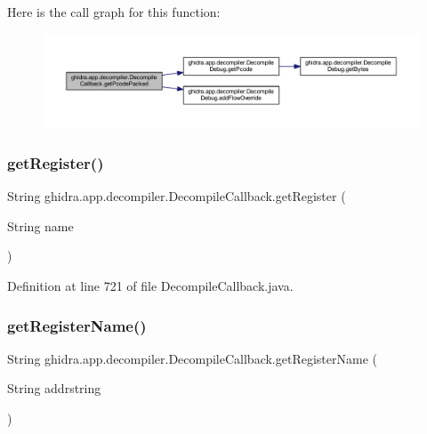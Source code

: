 Here is the call graph for this function\+:
\nopagebreak
\begin{figure}[H]
\begin{center}
\leavevmode
\includegraphics[width=350pt]{classghidra_1_1app_1_1decompiler_1_1_decompile_callback_ad121a6b6161280d72577fdf455fd26ac_cgraph}
\end{center}
\end{figure}
\mbox{\label{classghidra_1_1app_1_1decompiler_1_1_decompile_callback_abc9fc80436baf9487eab631253db920f}} 
\subsubsection{\texorpdfstring{getRegister()}{getRegister()}}
{\footnotesize\ttfamily String ghidra.\+app.\+decompiler.\+Decompile\+Callback.\+get\+Register (\begin{DoxyParamCaption}\item[{String}]{name }\end{DoxyParamCaption})\hspace{0.3cm}{\ttfamily [inline]}}



Definition at line 721 of file Decompile\+Callback.\+java.

\mbox{\label{classghidra_1_1app_1_1decompiler_1_1_decompile_callback_ad51f66c28eeca53ef3fc87faf289c76c}} 
\subsubsection{\texorpdfstring{getRegisterName()}{getRegisterName()}}
{\footnotesize\ttfamily String ghidra.\+app.\+decompiler.\+Decompile\+Callback.\+get\+Register\+Name (\begin{DoxyParamCaption}\item[{String}]{addrstring }\end{DoxyParamCaption})\hspace{0.3cm}{\ttfamily [inline]}}



